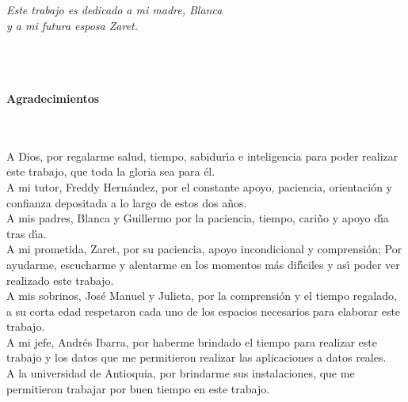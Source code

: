 \begin{flushright}
\begin{minipage}{12cm}
    \noindent
        \small
				\textsl{Este trabajo es dedicado a mi madre, Blanca\\
				y a mi futura esposa Zaret.}\\
\end{minipage}
\end{flushright}

\newpage{\pagestyle{empty}\cleardoublepage}

\newpage
\thispagestyle{empty} \textbf{}\normalsize
\\\\\\%
\textbf{\LARGE Agradecimientos}
\\\\

A Dios, por regalarme salud, tiempo, sabidur\'{\i}a e inteligencia para poder realizar este trabajo, que toda la gloria sea para \'{e}l.\\

A mi tutor, Freddy Hern\'{a}ndez, por el constante apoyo, paciencia, orientaci\'{o}n y confianza depositada a lo largo de estos dos a\~{n}os.\\

A mis padres, Blanca y Guillermo por la paciencia, tiempo, cari\~{n}o y apoyo d\'{\i}a tras d\'{\i}a.\\

A mi prometida, Zaret, por su paciencia, apoyo incondicional y comprensi\'{o}n; Por ayudarme, escucharme y alentarme en los momentos m\'{a}s dif\'{\i}ciles y as\'{\i} poder ver realizado este trabajo.\\

A mis sobrinos, Jos\'{e} Manuel y Julieta, por la comprensi\'{o}n y el tiempo regalado, a su corta edad respetaron cada uno de los espacios necesarios para elaborar este trabajo.\\

A mi jefe, Andr\'{e}s Ibarra, por haberme brindado el tiempo para realizar este trabajo y los datos que me permitieron realizar las aplicaciones a datos reales.\\

A la universidad de Antioquia, por brindarme sus instalaciones, que me permitieron trabajar por buen tiempo en este trabajo. 

\newpage{\pagestyle{empty}\cleardoublepage}


